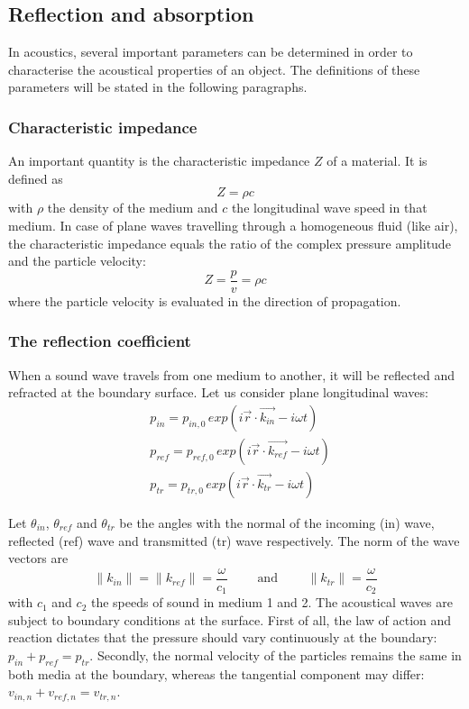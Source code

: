 
\subsection{Reflection and absorption}
In acoustics, several important parameters can be determined in order to characterise the acoustical properties of an object. The  definitions of these parameters will be stated in the following paragraphs.


\subsubsection*{Characteristic impedance}
\vspace{-15pt}
An important quantity is the characteristic impedance $Z$ of a material. It is defined as 
\[
Z = \rho c
\]
with $\rho$ the density of the medium and $c$ the longitudinal wave speed in that medium. In case of plane waves travelling through a homogeneous fluid (like air), the characteristic impedance equals the ratio of the complex pressure amplitude and the particle velocity:
\[
Z = \frac{p}{v} = \rho c
\]
where the particle velocity is evaluated in the direction of propagation.


\subsubsection*{The reflection coefficient}
\vspace{-15pt}
When a sound wave travels from one medium to another, it will be reflected and refracted at the boundary surface. Let us consider plane longitudinal waves:
\begin{align*}
&p_{in} = p_{in,0}\, exp\left(i \vec{r} \cdot \vec{k_{in}} - i \omega t \right)\\
&p_{ref} = p_{ref,0}\, exp\left(i \vec{r} \cdot \vec{k_{ref}} - i \omega t \right)\\
&p_{tr} = p_{tr,0}\, exp\left(i \vec{r} \cdot \vec{k_{tr}} - i \omega t \right)
\end{align*}

Let $\theta_{in}$, $\theta_{ref}$ and $\theta_{tr}$ be the angles with the normal of the incoming (in) wave, reflected (ref) wave and transmitted (tr) wave respectively. The norm of the wave vectors are 
\[
\left\|k_{in}\right\| = \left\|k_{ref}\right\| = \frac{\omega}{c_1} \qquad \textrm{ and } \qquad \left\|k_{tr}\right\| = \frac{\omega}{c_2}
\]
with $c_1$ and $c_2$ the speeds of sound in medium 1 and 2. The acoustical waves are subject to boundary conditions at the surface. First of all, the law of action and reaction dictates that the pressure should vary continuously at the boundary: $p_{in} + p_{ref} = p_{tr}$.
Secondly, the normal velocity of the particles remains the same in both media at the boundary, whereas the tangential component may differ: $v_{in,n} + v_{ref,n} = v_{tr,n}$.

